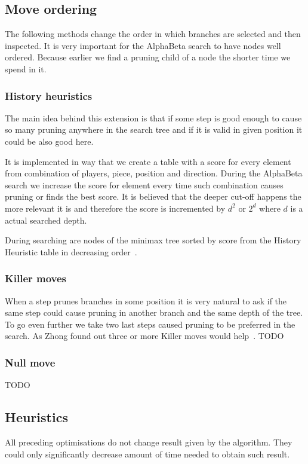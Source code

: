\subsection{Move ordering}
The following methods change the order in which branches are selected and then
inspected. It is very important for the AlphaBeta search to have nodes well
ordered. Because earlier we find a pruning child of a node the shorter time
we spend in it.

	\subsubsection{History heuristics}
	The main idea behind this extension is that if some step is good enough
	to cause so many pruning anywhere in the search tree and if it is valid in
	given position it could be also good here.

	It is implemented in way that we create a table with a score for every
	element from combination of players, piece, position and direction. During
	the AlphaBeta search we increase the score for element every time such
	combination causes pruning or finds the best score. It is believed that
	the deeper cut-off happens the more relevant it is and therefore the score
	is incremented by $d^2$ or $2^d$ where $d$ is a actual searched depth.

	During searching are nodes of the minimax tree sorted by score from the
	History Heuristic table in decreasing order~\cite{COX}.

	\subsubsection{Killer moves}
	When a step prunes branches in some position it is very natural to ask if
	the same step could cause pruning in another branch and the same depth of
	the tree. To go even further we take two last steps caused pruning to be
	preferred in the search. As Zhong found out three or more Killer moves would help~\cite{ZHONG}. TODO

	\subsubsection{Null move}
	TODO


\subsection{Heuristics}
All preceding optimisations do not change result given by the algorithm. They
could only significantly decrease amount of time needed to obtain such result.

